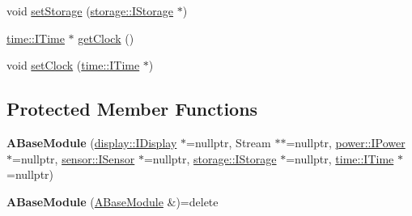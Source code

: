 \begin{DoxyCompactItemize}
\item 
void \mbox{\hyperlink{classathome_1_1module_1_1_a_base_module_a91e714579636e6f4a3628a23a8ba61e7}{set\+Storage}} (\mbox{\hyperlink{classathome_1_1storage_1_1_i_storage}{storage\+::\+I\+Storage}} $\ast$)
\item 
\mbox{\hyperlink{structathome_1_1time_1_1_i_time}{time\+::\+I\+Time}} $\ast$ \mbox{\hyperlink{classathome_1_1module_1_1_a_base_module_a6204e0dd2cb6fa166f96c62224e7d10d}{get\+Clock}} ()
\item 
void \mbox{\hyperlink{classathome_1_1module_1_1_a_base_module_a98621be03deb721373010be2a16dc585}{set\+Clock}} (\mbox{\hyperlink{structathome_1_1time_1_1_i_time}{time\+::\+I\+Time}} $\ast$)
\end{DoxyCompactItemize}
\subsection*{Protected Member Functions}
\begin{DoxyCompactItemize}
\item 
\mbox{\label{classathome_1_1module_1_1_a_base_module_a4d61fc38c73893ac32a5932fbbb998d1}} 
{\bfseries A\+Base\+Module} (\mbox{\hyperlink{classathome_1_1display_1_1_i_display}{display\+::\+I\+Display}} $\ast$=nullptr, Stream $\ast$$\ast$=nullptr, \mbox{\hyperlink{classathome_1_1power_1_1_i_power}{power\+::\+I\+Power}} $\ast$=nullptr, \mbox{\hyperlink{classathome_1_1sensor_1_1_i_sensor}{sensor\+::\+I\+Sensor}} $\ast$=nullptr, \mbox{\hyperlink{classathome_1_1storage_1_1_i_storage}{storage\+::\+I\+Storage}} $\ast$=nullptr, \mbox{\hyperlink{structathome_1_1time_1_1_i_time}{time\+::\+I\+Time}} $\ast$=nullptr)
\item 
\mbox{\label{classathome_1_1module_1_1_a_base_module_ae2c52cb3313abb5ceb3c7bdb854e9850}} 
{\bfseries A\+Base\+Module} (\mbox{\hyperlink{classathome_1_1module_1_1_a_base_module}{A\+Base\+Module}} \&)=delete
\end{DoxyCompactItemize}
